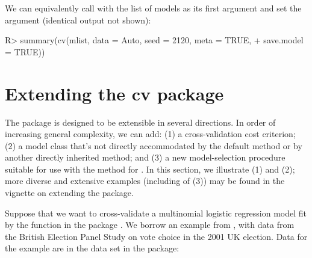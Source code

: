 \documentclass[
]{jss}
\begin{document}
We can equivalently call  with the list of models as its
first argument and set the argument  (identical output
not shown):

\begin{CodeChunk}
\begin{CodeInput}
R> summary(cv(mlist, data = Auto, seed = 2120, meta = TRUE,
+            save.model = TRUE))
\end{CodeInput}
\end{CodeChunk}

\section{Extending the cv package}\label{extending-the-cv-package}

The  package is designed to be extensible in several directions.
In order of increasing general complexity, we can add: (1) a
cross-validation cost criterion; (2) a model class that's not directly
accommodated by the  default method or by another directly
inherited method; and (3) a new model-selection procedure suitable for
use with the  method for . In this section,
we illustrate (1) and (2); more diverse and extensive examples
(including of (3)) may be found in the vignette on extending the
 package.

Suppose that we want to cross-validate a multinomial logistic regression
model fit by the  function in the  package
\citep{VenablesRipley:2002}. We borrow an example from \citet[Sec.
14.2.1]{Fox:2016}, with data from the British Election Panel Study on
vote choice in the 2001 UK election. Data for the example are in the
 data set in the  package:
\end{document}
